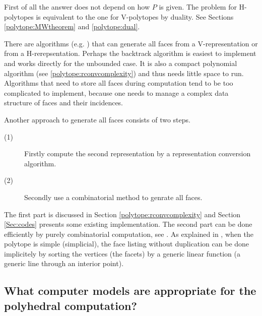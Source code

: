 \documentclass[[a4paper,12pt]{article}
\begin{document}
First of all the answer does not depend on how $P$ is given.
The problem for H-polytopes is equivalent to
the one for V-polytopes by duality.
See Sections \ref{polytope:MWtheorem} and \ref{polytope:dual}.

There are algorithms (e.g. \cite{r-dchhd-92,s-chdch-86,flm-abala-97} )
that can generate all faces from
a V-representation or from a H-rerepsentation.  Perhaps the backtrack
algorithm \cite{flm-abala-97} is easiest to implement and works
directly for the unbounded case.  It is also
a compact polynomial algorithm (see \ref{polytope:rconvcomplexity})
and thus needs little space to run.
Algorithms that need to store all faces during computation
tend to be too complicated to
implement, because one needs to manage a complex
data structure of faces and their incidences.

Another approach to generate all faces consists of
two steps. 
\begin{description}
  \item [(1)] Firstly compute the second representation by a representation
conversion algorithm.
  \item [(2)] Secondly use a combinatorial method to genrate all
faces.
\end{description}
The first part is discussed in Section \ref{polytope:rconvcomplexity} and 
Section \ref{Sec:codes} presents some existing implementation.  
The second part can be done efficiently by
purely combinatorial computation, see \cite{fr-cfecp-94}.
As explained in \cite{fr-cfecp-94}, 
when the polytope is simple (simplicial), the face listing without
duplication can be done implicitely by sorting the vertices (the facets)
by a generic linear function (a generic line through an interior
point).  


\subsection{What computer models are appropriate
for the polyhedral computation?} \label{polytope:computermodel}
\end{document}
